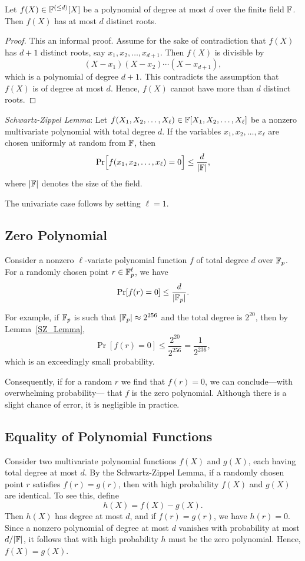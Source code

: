\begin{theorem}
    Let $f(X) \in \mathbb{F}^{(\leq d)}[X]$ be a polynomial of degree at most $d$ over the finite field $\mathbb{F}$. Then $f(X)$ has at most $d$ distinct roots.
\end{theorem}

\begin{proof}
    This an informal proof. Assume for the sake of contradiction that $f(X)$ has $d+1$ distinct roots, say $x_1, x_2, \ldots, x_{d+1}$. 
    Then $f(X)$ is divisible by
    \[
        (X - x_1)(X - x_2) \cdots (X - x_{d+1}),
    \]
    which is a polynomial of degree $d+1$. This contradicts the assumption that $f(X)$ is of degree at most $d$. Hence, $f(X)$ cannot have more than $d$ distinct roots.
\end{proof}

\begin{lemma} \label{SZ_Lemma}
    \textit{Schwartz-Zippel Lemma}: Let $f(X_1, X_2, \ldots, X_{\ell}) \in \mathbb{F}[X_1, X_2, \ldots, X_{\ell}]$ be a nonzero multivariate polynomial with total degree $d$. 
    If the variables $x_1, x_2, \ldots, x_{\ell}$ are chosen uniformly at random from $\mathbb{F}$, then
    \[
        \Pr\Bigl[f(x_1, x_2, \ldots, x_{\ell}) = 0\Bigr] \le \frac{d}{|\mathbb{F}|},
    \]
    where $|\mathbb{F}|$ denotes the size of the field.
\end{lemma}
The univariate case follows by setting $\ell = 1$.

\subsection{Zero Polynomial}
Consider a nonzero $\ell$-variate polynomial function $f$ of total degree $d$ over $\mathbb{F}_p$. 
For a randomly chosen point $r \in \mathbb{F}_p^{\ell}$, we have
\[
    \Pr[f(r) = 0] \le \frac{d}{|\mathbb{F}_p|}.
\]

For example, if $\mathbb{F}_p$ is such that $|\mathbb{F}_p| \approx 2^{256}$ and the total degree is $2^{20}$, then by Lemma~\ref{SZ_Lemma},
\[
    \Pr[f(r) = 0] \le \frac{2^{20}}{2^{256}} = \frac{1}{2^{236}},
\]
which is an exceedingly small probability.

Consequently, if for a random $r$ we find that $f(r)=0$, we can conclude—with overwhelming probability—
that $f$ is the zero polynomial. Although there is a slight chance of error, it is negligible in practice.

\subsection{Equality of Polynomial Functions}
Consider two multivariate polynomial functions $f(X)$ and $g(X)$, each having total degree at most $d$. 
By the Schwartz-Zippel Lemma, if a randomly chosen point $r$ satisfies $f(r) = g(r)$, then with high probability $f(X)$ and $g(X)$ are identical. To see this, define
\[
    h(X) = f(X) - g(X).
\]
Then $h(X)$ has degree at most $d$, and if $f(r) = g(r)$, we have $h(r)=0$. 
Since a nonzero polynomial of degree at most $d$ vanishes with probability at most $d/|\mathbb{F}|$, it follows that with high probability $h$ must be the zero polynomial. Hence, $f(X) = g(X)$.



\printbibliography[heading=subbibliography]